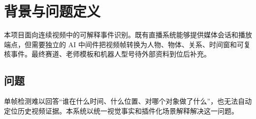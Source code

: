 \section{背景与问题定义}

本项目面向连续视频中的可解释事件识别。既有直播系统能够提供媒体会话和播放端点，但需要独立的 AI 中间件把视频帧转换为人物、物体、关系、时间窗和可复核事件。最终赛道、老师模板和机器人型号待外部资料到位后补充。

\subsection{问题}
单帧检测难以回答“谁在什么时间、什么位置、对哪个对象做了什么”，也无法自动定位历史视频证据。本系统以统一视觉事实和插件化场景解释解决这一问题。
